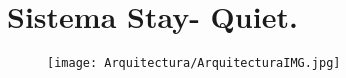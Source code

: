 \section{Sistema Stay- Quiet.}
\begin{figure}[htbp!]
	\begin{center}
		\texttt{[image: Arquitectura/ArquitecturaIMG.jpg]}
	\end{center}
\end{figure}


